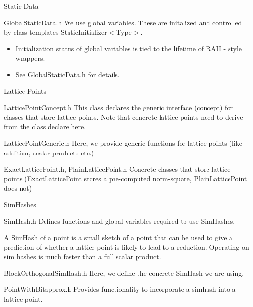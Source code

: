 \documentclass{beamer}
\begin{document}
\begin{frame}{Static Data}
\begin{block}{GlobalStaticData.h}
We use global variables. These are initalized and controlled by class templates StaticInitializer$<$Type$>$.
\begin{itemize}
\item Initialization status of global variables is tied to the lifetime of RAII - style wrappers.
\item See GlobalStaticData.h for details.
\end{itemize}
\end{block}
\end{frame}

\begin{frame}{Lattice Points}
\begin{block}{LatticePointConcept.h}
This class declares the generic interface (concept) for classes that store lattice points.
Note that concrete lattice points need to derive from the class declare here.
\end{block}
\begin{block}{LatticePointGeneric.h}
Here, we provide generic functions for lattice points (like addition, scalar products etc.)
\end{block}
\begin{block}{ExactLatticePoint.h, PlainLatticePoint.h}
Concrete classes that store lattice points (ExactLatticePoint stores a pre-computed norm-square, PlainLatticePoint does not)
\end{block}
\end{frame}

\begin{frame}{SimHashes}
\begin{block}{SimHash.h}
Defines functions and global variables required to use SimHashes.

A SimHash of a point is a small sketch of a point that can be used to give a prediction of whether a lattice point is likely to lead to a reduction.
Operating on sim hashes is much faster than a full scalar product.
\end{block}
\begin{block}{BlockOrthogonalSimHash.h}
Here, we define the concrete SimHash we are using.
\end{block}
\begin{block}{PointWithBitapprox.h}
Provides functionality to incorporate a simhash into a lattice point.
\end{block}
\end{frame}
\end{document}

